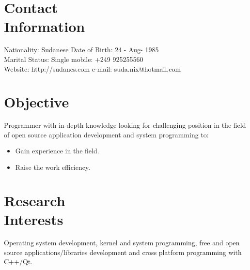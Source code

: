 \documentclass[margin,line]{resume}
\begin{document}
\begin{resume}

    \section{\mysidestyle Contact\\Information}

    Nationality: Sudanese                            \hfill Date of Birth: 24 - Aug- 1985 \vspace{0mm}\\\vspace{0mm}%
   Marital Status: Single                              \hfill mobile: +249 925255560          \vspace{0mm}\\\vspace{0mm}%
    Website:	  http://sudancs.com      \hfill e-mail: suda.nix@hotmail.com  \vspace{0mm}\\\vspace{-4.5mm}%

\section{\mysidestyle Objective}
Programmer with in-depth knowledge looking for challenging position in the field of open source application development and system programming to:
\begin{itemize}
\item Gain experience in the field.
\item Raise the work efficiency.
\end{itemize}

    \section{\mysidestyle Research\\Interests}
Operating system development, kernel and system programming, free and open source applications/libraries development and cross platform programming with C++/Qt.


\end{resume}
\end{document}
